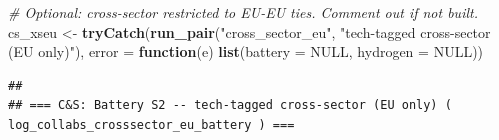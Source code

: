 \documentclass[
]{article}
\newenvironment{Shaded}{\begin{snugshade}}{\end{snugshade}}
\newcommand{\AttributeTok}[1]{\textcolor[rgb]{0.13,0.29,0.53}{#1}}
\newcommand{\CommentTok}[1]{\textcolor[rgb]{0.56,0.35,0.01}{\textit{#1}}}
\newcommand{\ConstantTok}[1]{\textcolor[rgb]{0.56,0.35,0.01}{#1}}
\newcommand{\ControlFlowTok}[1]{\textcolor[rgb]{0.13,0.29,0.53}{\textbf{#1}}}
\newcommand{\FunctionTok}[1]{\textcolor[rgb]{0.13,0.29,0.53}{\textbf{#1}}}
\newcommand{\NormalTok}[1]{#1}
\newcommand{\OtherTok}[1]{\textcolor[rgb]{0.56,0.35,0.01}{#1}}
\newcommand{\StringTok}[1]{\textcolor[rgb]{0.31,0.60,0.02}{#1}}
\begin{document}
\begin{Shaded}
\begin{Highlighting}[]
\CommentTok{\# Optional: cross{-}sector restricted to EU{-}EU ties. Comment out if not built.}
\NormalTok{cs\_xseu }\OtherTok{\textless{}{-}} \FunctionTok{tryCatch}\NormalTok{(}\FunctionTok{run\_pair}\NormalTok{(}\StringTok{"cross\_sector\_eu"}\NormalTok{, }\StringTok{"tech{-}tagged cross{-}sector (EU only)"}\NormalTok{),}
                    \AttributeTok{error =} \ControlFlowTok{function}\NormalTok{(e) }\FunctionTok{list}\NormalTok{(}\AttributeTok{battery =} \ConstantTok{NULL}\NormalTok{, }\AttributeTok{hydrogen =} \ConstantTok{NULL}\NormalTok{))}
\end{Highlighting}
\end{Shaded}

\begin{verbatim}
## 
## === C&S: Battery S2 -- tech-tagged cross-sector (EU only) ( log_collabs_crosssector_eu_battery ) ===
\end{verbatim}
\end{document}
